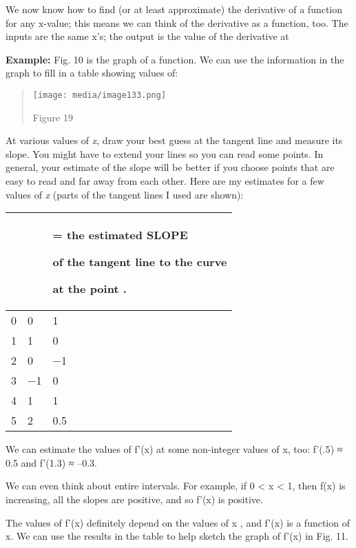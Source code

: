 We now know how to find (or at least approximate) the derivative of a
function for any x-value; this means we can think of the derivative as a
function, too. The inputs are the same x's; the output is the value of
the derivative at

\textbf{Example:} Fig. 10 is the graph of a function. We can use the
information in the graph to fill in a table showing values of:

\begin{quote}
\texttt{[image: media/image133.png]}

Figure 19
\end{quote}

At various values of \emph{x}, draw your best guess at the tangent line
and measure its slope. You might have to extend your lines so you can
read some points. In general, your estimate of the slope will be better
if you choose points that are easy to read and far away from each other.
Here are my estimates for a few values of \emph{x} (parts of the tangent
lines I used are shown):

\begin{longtable}[]{@{}lll@{}}
\toprule
\begin{minipage}[b]{0.32\columnwidth}\raggedright\strut
\strut
\end{minipage} & \begin{minipage}[b]{0.32\columnwidth}\raggedright\strut
\strut
\end{minipage} & \begin{minipage}[b]{0.32\columnwidth}\raggedright\strut
= the estimated SLOPE

of the tangent line to the curve

at the point .\strut
\end{minipage}\tabularnewline
\midrule
\endhead
0 & 0 & 1\tabularnewline
1 & 1 & 0\tabularnewline
2 & 0 & −1\tabularnewline
3 & −1 & 0\tabularnewline
4 & 1 & 1\tabularnewline
5 & 2 & 0.5\tabularnewline
\bottomrule
\end{longtable}

We can estimate the values of f'(x) at some non-integer values of x,
too: f'(.5) ≈ 0.5 and f'(1.3) ≈ --0.3.

We can even think about entire intervals. For example, if 0 \textless{}
x \textless{} 1, then f(x) is increasing, all the slopes are positive,
and so f'(x) is positive.

The values of f'(x) definitely depend on the values of x , and f'(x) is
a function of x. We can use the results in the table to help sketch the
graph of f'(x) in Fig. 11.

